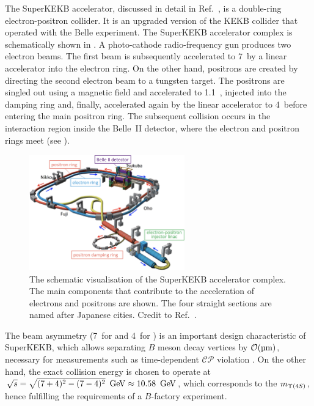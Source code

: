 The SuperKEKB accelerator, discussed in detail in Ref.~\cite{Akai:2018mbz}, is a double-ring electron-positron collider.
It is an upgraded version of the KEKB collider \cite{Oide:2009zz} that operated with the Belle experiment.
The SuperKEKB accelerator complex is schematically shown in .
A photo-cathode radio-frequency gun produces two electron beams.
The first beam is subsequently accelerated to 7~\gev by a linear accelerator into the electron ring.
On the other hand, positrons are created by directing the second electron beam to a tungsten target.
The positrons are singled out using a magnetic field and accelerated to 1.1~\gev, injected into the damping ring and, finally,
accelerated again by the linear accelerator to 4~\gev before entering the main positron ring.
The subsequent collision occurs in the interaction region inside the Belle~II detector, where the electron and positron rings meet (see ).
\begin{figure}[hbtp!]
    \centering
    \includegraphics[width=0.6\textwidth]{figures/experimental_setup/super_kekb.png}
    \caption{\label{fig:superkekb}
        The schematic visualisation of the SuperKEKB accelerator complex.
        The main components that contribute to the acceleration of electrons and positrons are shown.
        The four straight sections are named after Japanese cities.
        Credit to Ref.~\cite{Akai:2018mbz}.
    }
\end{figure}

The beam asymmetry (7~\gev for \en and 4~\gev for \ep) is an important design characteristic of SuperKEKB, 
which allows separating $B$ meson decay vertices by ${\cal O}(\si{\micro\meter})$, necessary for measurements such as time-dependent $\mathcal{CP}$ violation \cite{BaBar:2014omp}.
On the other hand, the exact collision energy is chosen to operate at $\sqrt{s}=\sqrt{(7+4)^2-(7-4)^2}~\mathrm{\,Ge\kern -0.1em V}\approx10.58~\mathrm{\,Ge\kern -0.1em V}$, which corresponds to the $m_{\FourS}$, 
hence fulfilling the requirements of a $B$-factory experiment.

